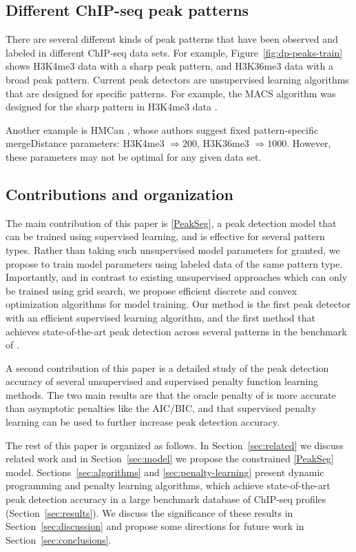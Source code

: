 \documentclass{article}
\begin{document}
\subsection{Different ChIP-seq peak patterns}

There are several different kinds of peak patterns that have been
observed and labeled in different ChIP-seq data sets. For example,
Figure~\ref{fig:dp-peaks-train} shows H3K4me3 data with a sharp peak
pattern, and H3K36me3 data with a broad peak pattern. Current peak
detectors are unsupervised learning algorithms that are designed for
specific patterns. For example, the MACS algorithm was designed for
the sharp pattern in H3K4me3 data \citep{MACS}.

Another example is HMCan \citep{HMCan}, whose authors suggest fixed
pattern-specific mergeDistance parameters: H3K4me3 $\Rightarrow 200$,
H3K36me3 $\Rightarrow 1000$. However, these parameters may not be
optimal for any given data set.

\subsection{Contributions and organization}

The main contribution of this paper is \ref{PeakSeg}, a peak detection
model that can be trained using supervised learning, and is effective
for several pattern types. Rather than taking such unsupervised model
parameters for granted, we propose to train model parameters using
labeled data of the same pattern type. Importantly, and in contrast to
existing unsupervised approaches which can only be trained using grid
search, we propose efficient discrete and convex optimization
algorithms for model training. Our method is the first peak detector
with an efficient supervised learning algorithm, and the first method
that achieves state-of-the-art peak detection across several 
patterns in the benchmark of \citet{hocking2014visual}.

A second contribution of this paper is a detailed study of the peak
detection accuracy of several unsupervised and supervised penalty
function learning methods. The two main results are that the oracle
penalty of \citet{cleynen2013segmentation} is more accurate than
asymptotic penalties like the AIC/BIC, and that supervised penalty
learning can be used to further increase peak detection accuracy.

The rest of this paper is organized as follows. In
Section~\ref{sec:related} we discuss related work and in
Section~\ref{sec:model} we propose the constrained \ref{PeakSeg}
model. Sections~\ref{sec:algorithms} and \ref{sec:penalty-learning}
present dynamic programming and penalty learning algorithms, which
achieve state-of-the-art peak detection accuracy in a large benchmark
database of ChIP-seq profiles (Section~\ref{sec:results}). We discuss
the significance of these results in Section~\ref{sec:discussion} and
propose some directions for future work in
Section~\ref{sec:conclusions}.
\end{document}
